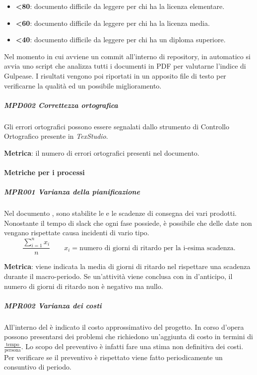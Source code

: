 				\begin{itemize}
					\item \textbf{<80}: documento  difficile da leggere per chi ha la licenza elementare.
					\item \textbf{<60}: documento  difficile da leggere per chi ha la licenza media.
					\item \textbf{<40}: documento difficile da leggere per chi ha un diploma superiore.
				\end{itemize}

				Nel momento in cui avviene un commit all'interno di repository, in automatico si avvia uno script che analizza tutti i documenti in PDF per valutarne l'indice di Gulpease. I risultati vengono poi riportati in un apposito file di testo per verificarne la qualità ed un possibile miglioramento.

				\subparagraph{MPD002 Correttezza ortografica}
				Gli errori ortografici possono essere segnalati dallo strumento di Controllo Ortografico presente in \textit{TexStudio}.

				\textbf{Metrica}: il numero di errori ortografici presenti nel documento.

			\paragraph{Metriche per i processi}
				\subparagraph{MPR001 Varianza della pianificazione}
				Nel documento \Doc{\PdPv}, sono stabilite le  e le scadenze di consegna dei vari prodotti.
				Nonostante il tempo di slack che ogni fase possiede, è possibile che delle date non vengano rispettate causa incidenti di vario tipo.
				\[\dfrac{\sum_{i=1}^{n} x_i}{n} \qquad x_i=\text{numero di giorni di ritardo per la i-esima scadenza.}\]


				\textbf{Metrica}: viene indicata la media di giorni di ritardo nel rispettare una scadenza durante il macro-periodo. Se un'attività viene conclusa con in d'anticipo, il numero di giorni di ritardo non è negativo ma nullo.

				\subparagraph{MPR002 Varianza dei costi}
				All'interno del \Doc{\PdPv} è indicato il costo approssimativo del progetto.
				In corso d'opera possono presentarsi dei problemi che richiedono un'aggiunta di costo in termini di $\frac{\text{tempo}}{\text{persona}}$.
				Lo scopo del preventivo è infatti fare una stima non definitiva dei costi. Per verificare se il preventivo è rispettato viene fatto periodicamente un consuntivo di periodo.

